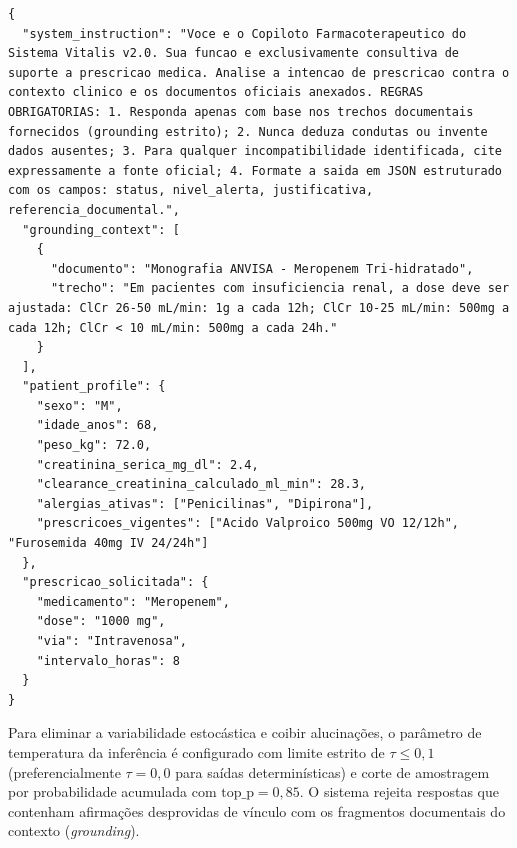 \begin{lstlisting}[caption={Estrutura de prompt clínico compartimentado para o RAG (formato JSON)}, label={lst:prompt_rag}]
{
  "system_instruction": "Voce e o Copiloto Farmacoterapeutico do Sistema Vitalis v2.0. Sua funcao e exclusivamente consultiva de suporte a prescricao medica. Analise a intencao de prescricao contra o contexto clinico e os documentos oficiais anexados. REGRAS OBRIGATORIAS: 1. Responda apenas com base nos trechos documentais fornecidos (grounding estrito); 2. Nunca deduza condutas ou invente dados ausentes; 3. Para qualquer incompatibilidade identificada, cite expressamente a fonte oficial; 4. Formate a saida em JSON estruturado com os campos: status, nivel_alerta, justificativa, referencia_documental.",
  "grounding_context": [
    {
      "documento": "Monografia ANVISA - Meropenem Tri-hidratado",
      "trecho": "Em pacientes com insuficiencia renal, a dose deve ser ajustada: ClCr 26-50 mL/min: 1g a cada 12h; ClCr 10-25 mL/min: 500mg a cada 12h; ClCr < 10 mL/min: 500mg a cada 24h."
    }
  ],
  "patient_profile": {
    "sexo": "M",
    "idade_anos": 68,
    "peso_kg": 72.0,
    "creatinina_serica_mg_dl": 2.4,
    "clearance_creatinina_calculado_ml_min": 28.3,
    "alergias_ativas": ["Penicilinas", "Dipirona"],
    "prescricoes_vigentes": ["Acido Valproico 500mg VO 12/12h", "Furosemida 40mg IV 24/24h"]
  },
  "prescricao_solicitada": {
    "medicamento": "Meropenem",
    "dose": "1000 mg",
    "via": "Intravenosa",
    "intervalo_horas": 8
  }
}
\end{lstlisting}

Para eliminar a variabilidade estocástica e coibir alucinações, o parâmetro de temperatura da inferência é configurado com limite estrito de $\tau \le 0{,}1$ (preferencialmente $\tau = 0{,}0$ para saídas determinísticas) e corte de amostragem por probabilidade acumulada com $\text{top\_p} = 0{,}85$. O sistema rejeita respostas que contenham afirmações desprovidas de vínculo com os fragmentos documentais do contexto (\textit{grounding}).

